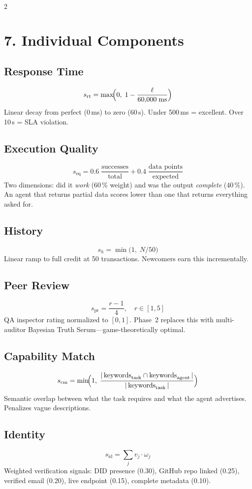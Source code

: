 \documentclass[10pt,a4paper]{article}
\begin{document}
\begin{multicols}{2}

\section{7.\; Individual Components}

\subsection{Response Time}
\[
  s_{\text{rt}} = \max\!\Bigl(0,\;
    1 - \frac{\ell}{60{,}000\;\text{ms}}\Bigr)
\]
Linear decay from perfect (0\,ms) to zero (60\,s). Under 500\,ms = excellent. Over 10\,s = SLA violation.

\subsection{Execution Quality}
\[
  s_{\text{eq}} = 0.6\;\frac{\text{successes}}{\text{total}}
  + 0.4\;\frac{\text{data points}}{\text{expected}}
\]
Two dimensions: did it \emph{work} (60\,\% weight) and was the output \emph{complete} (40\,\%). An agent that returns partial data scores lower than one that returns everything asked for.

\subsection{History}
\[
  s_{h} = \min\!\bigl(1,\; N/50\bigr)
\]
Linear ramp to full credit at 50 transactions. Newcomers earn this incrementally.

\subsection{Peer Review}
\[
  s_{\text{pr}} = \frac{r - 1}{4},
  \quad r \in [1,5]
\]
QA inspector rating normalized to $[0,1]$. Phase~2 replaces this with multi-auditor Bayesian Truth Serum---game-theoretically optimal.

\subsection{Capability Match}
\[
  s_{\text{cm}} = \min\!\Bigl(1,\;
    \frac{|\,\text{keywords}_\text{task}
          \cap \text{keywords}_\text{agent}\,|}
         {|\,\text{keywords}_\text{task}\,|}\Bigr)
\]
Semantic overlap between what the task requires and what the agent advertises. Penalizes vague descriptions.

\subsection{Identity}
\[
  s_{\text{id}} = \sum_j v_j \cdot \omega_j
\]
Weighted verification signals: DID presence (0.30), GitHub repo linked (0.25), verified email (0.20), live endpoint (0.15), complete metadata (0.10).



\end{multicols}
\end{document}
